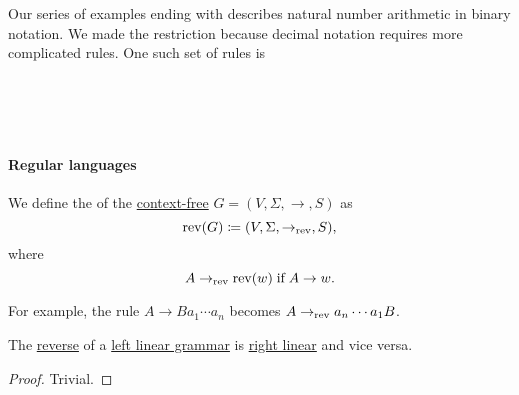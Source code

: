 \begin{remark}\label{rem:decimal_notation_grammar}
  Our series of examples ending with  describes natural number arithmetic in binary notation. We made the restriction because decimal notation requires more complicated rules. One such set of rules is
  \begin{bnf*}
      { \bnfor {} \bnfor \cdots \bnfor {}} \\
              { \bnfor {}} \\
       { \bnfor {} \bnfsp {}} \\
     { \bnfor {} \bnfsp {}}
  \end{bnf*}
\end{remark}

\paragraph{Regular languages}

\begin{definition}\label{def:reverse_grammar}
  We define the  of the \hyperref[def:chomsky_hierarchy/context_free]{context-free} \( G = (V, \Sigma, \to, S) \) as
  \begin{equation*}
    \operatorname{rev}(G) \coloneqq (V, \Sigma, \to_{\operatorname{rev}}, S),
  \end{equation*}
  where
  \begin{equation*}
    A \to_{\op{rev}} \op{rev}(w) \T{if} A \to w.
  \end{equation*}
\end{definition}
\begin{comments}
  \item For example, the rule \( A \to Ba_1 \cdots a_n \) becomes \( A \to_{\operatorname{rev}} a_n \cdots a_1 B \).
\end{comments}

\begin{proposition}\label{thm:reverse_linear_grammar}
  The \hyperref[def:reverse_grammar]{reverse} of a \hyperref[def:chomsky_hierarchy/regular]{left linear grammar} is \hyperref[def:chomsky_hierarchy/regular]{right linear} and vice versa.
\end{proposition}
\begin{proof}
  Trivial.
\end{proof}


